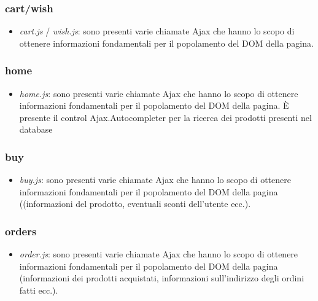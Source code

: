 \documentclass[12pt]{extarticle}
\begin{document}
\subsubsection*{cart/wish}
\begin{itemize}
    \item \textit{cart.js} / \textit{wish.js}: sono presenti varie chiamate Ajax che hanno lo scopo di ottenere
    informazioni fondamentali per il popolamento del DOM della pagina.
\end{itemize}

\subsubsection*{home}
\begin{itemize}
    \item \textit{home.js}: sono presenti varie chiamate Ajax che hanno lo scopo di ottenere informazioni
    fondamentali per il popolamento del DOM della pagina. È presente il control
    Ajax.Autocompleter per la ricerca dei prodotti presenti nel database
\end{itemize}

\subsubsection*{buy}
\begin{itemize}
    \item \textit{buy.js}: sono presenti varie chiamate Ajax che hanno lo scopo di ottenere informazioni
    fondamentali per il popolamento del DOM della pagina ((informazioni del prodotto, eventuali
    sconti dell'utente ecc.).
\end{itemize}

\subsubsection*{orders}
\begin{itemize}
    \item \textit{order.js}: sono presenti varie chiamate Ajax che hanno lo scopo di ottenere informazioni
    fondamentali per il popolamento del DOM della pagina (informazioni dei prodotti acquistati,
    informazioni sull'indirizzo degli ordini fatti ecc.).
\end{itemize}
\end{document}
